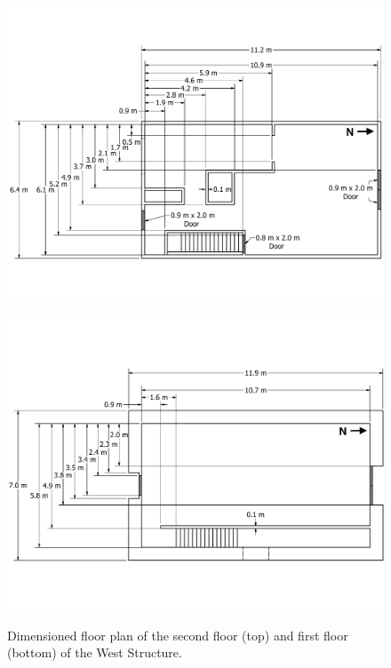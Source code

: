 \documentclass[12pt,oneside]{book}
\begin{document}
\begin{figure}[!ht]
	\includegraphics[width=\columnwidth]{..//Figures/Floor_Plans/West_Structure_2nd_Floor_Dimensioned_Full}
	\\~\\
	\includegraphics[width=\columnwidth]{../Figures/Floor_Plans/West_Structure_1st_Floor_Dimensioned_Full}
	\caption[Dimensioned floor plans of the West Structure.]{Dimensioned floor plan of the second floor (top) and first floor (bottom) of the West Structure.}
	\label{fig:west_dimensioned_plan}
\end{figure}
\end{document}
